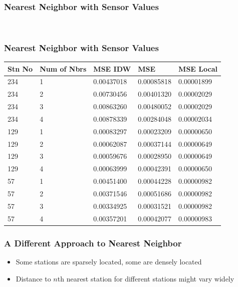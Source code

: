 \begin{frame}
\frametitle{Nearest Neighbor with Sensor Values}
~\\
\end{frame}

\begin{frame}
\frametitle{Nearest Neighbor with Sensor Values \continued}
\centering
\begin{tabular}{|l|l|l|l|l|}
\hline
	\textbf{Stn No} & \textbf{Num of Nbrs} & \textbf{MSE IDW} & \textbf{MSE} &\textbf{MSE Local}\\
\hline
234 & 1 & 0.00437018 & 0.00085818 & 0.00001899\\
\hline
234 & 2 & 0.00730456 & 0.00401320 & 0.00002029\\
\hline
234 & 3 & 0.00863260 & 0.00480052 & 0.00002029\\
\hline
234 & 4 & 0.00878339 & 0.00284048 & 0.00002034\\
\hline
129 & 1 & 0.00083297 & 0.00023209 & 0.00000650\\
\hline
129 & 2 & 0.00062087 & 0.00037144 & 0.00000649\\
\hline
129 & 3 & 0.00059676 & 0.00028950 & 0.00000649\\
\hline
129 & 4 & 0.00063999 & 0.00042391 & 0.00000650\\
\hline
57 & 1 & 0.00451400 & 0.00044228 & 0.00000982\\
\hline
57 & 2 & 0.00371546 & 0.00051686 & 0.00000982\\
\hline
57 & 3 & 0.00334925 & 0.00031521 & 0.00000982\\
\hline
57 & 4 & 0.00357201 & 0.00042077 & 0.00000983\\
\hline
\end{tabular}
\end{frame}

\begin{frame}
\frametitle{A Different Approach to Nearest Neighbor}
\begin{itemize}
\setlength\itemsep{1em}
\item Some stations are sparsely located, some are densely located
\item Distance to $n$th nearest station for different stations might vary widely
\end{itemize}
\end{frame}
